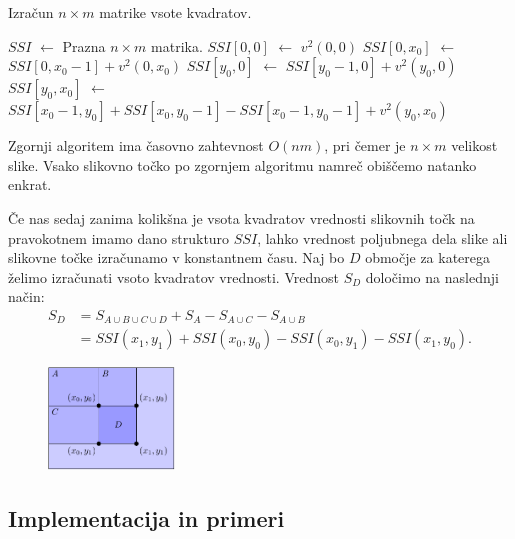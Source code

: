 %
\begin{algorithm}
  \caption{Izračun $n \times m$ matrike vsote kvadratov.}
  \label{alg:SSI}
\begin{algorithmic}[1]
  \State $SSI$ $\leftarrow$ Prazna $n \times m$ matrika.
  \State $SSI[0,0]$ $\leftarrow$ $v^2(0,0)$
    \State $SSI[0, x_0]$ $\leftarrow$ $SSI[0, x_0 - 1] + v^2(0, x_0)$
  \EndFor
    \State $SSI[y_0, 0]$ $\leftarrow$ $SSI[y_0 - 1, 0] + v^2(y_0, 0)$
  \EndFor
      \State $SSI[y_0, x_0]$ $\leftarrow$ $SSI[x_0 - 1, y_0] + SSI[x_0, y_0 - 1] - SSI[x_0 - 1, y_0 - 1] + v^2(y_0, x_0)$
    \EndFor
  \EndFor
\end{algorithmic}
\end{algorithm}
%

Zgornji algoritem ima časovno zahtevnost $O(nm)$, pri čemer je $n \times m$ velikost slike. Vsako slikovno točko po zgornjem algoritmu namreč obiščemo natanko enkrat.

Če nas sedaj zanima kolikšna je vsota kvadratov vrednosti slikovnih točk na pravokotnem  imamo dano strukturo $SSI$, lahko vrednost poljubnega dela slike ali slikovne točke izračunamo v konstantnem času. Naj bo $D$ območje za katerega želimo izračunati vsoto kvadratov vrednosti. Vrednost $S_D$ določimo na naslednji način:
%
\begin{align*}
S_D & = S_{A \cup B \cup C \cup D} + S_A - S_{A \cup C} - S_{A \cup B} \\
       & = SSI(x_1, y_1) + SSI(x_0, y_0) - SSI(x_0, y_1) - SSI(x_1, y_0).
\end{align*}
%

%
\begin{figure}[htbp]
  \centering
  \includegraphics[width=0.3\textwidth]{./slike-latex/ssi}
\end{figure}
%
\subsection{Implementacija in primeri}